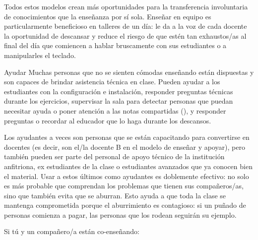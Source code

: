 Todos estos modelos crean más oportunidades para la transferencia involuntaria de conocimientos que la enseñanza por sí sola.
Enseñar en equipo es particularmente beneficioso en talleres de un día:
le da a la voz de cada docente la oportunidad de descansar
y reduce el riesgo de que estén tan exhaustos/as al final del día
que comiencen a hablar bruscamente con sus estudiantes
o a manipularles el teclado.

\begin{aside}{Ayudar}
  Muchas personas que no se sienten cómodas enseñando
  están dispuestas y son capaces de brindar asistencia técnica en clase.
  Pueden ayudar a los estudiantes con la configuración e instalación,
  responder preguntas técnicas durante los ejercicios,
  supervisar la sala para detectar personas que puedan necesitar ayuda
  o poner atención a las notas compartidas (),
  y responder preguntas
  o recordar al educador que lo haga durante los descansos.

  Los ayudantes a veces son personas que se están capacitando para convertirse en docentes
  (es decir, son el/la docente B en el modelo de enseñar y apoyar),
  pero también pueden ser parte del personal de apoyo técnico de la institución anfitriona,
  ex estudiantes de la clase
  o estudiantes avanzados que ya conocen bien el material.
  Usar a estos últimos como ayudantes es doblemente efectivo: no solo es más probable que comprendan los problemas que tienen sus compañeros/as,
  sino que también evita que se aburran.
  Esto ayuda a que toda la clase se mantenga comprometida porque el aburrimiento es contagioso:
  si un puñado de personas comienza a pagar,
  las personas que los rodean seguirán su ejemplo.
\end{aside}

Si tú y un compañero/a están co-enseñando:

